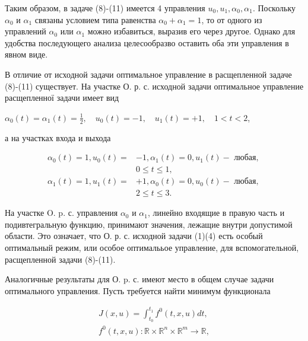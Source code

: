 \documentclass[10pt]{article}
\begin{document}
Таким образом, в задаче (8)-(11) имеется 4 управления $u_{0}, u_{1}, \alpha_{0}, \alpha_{1}$. Поскольку $\alpha_{0}$ и $\alpha_{1}$ связаны условием типа равенства $\alpha_{0}+\alpha_{1}=1$, то от одного из управлений $\alpha_{0}$ или $\alpha_{1}$ можно избавиться, выразив его через другое. Однако для удобства последующего анализа целесообразво оставить оба эти управления в явном виде.



В отличие от исходной задачи оптимальное управление в расщепленной задаче (8)-(11) существует. На участке О. р. с. исходной задачи оптимальное управление расщепленної задачи имеет вид



$\alpha_{0}(t)=\alpha_{1}(t)=\frac{1}{2}, \quad u_{0}(t)=-1, \quad u_{1}(t)=+1, \quad 1<t<2$,



а на участках входа и выхода



\[

\begin{aligned}

\alpha_{0}(t)=1, u_{0}(t)= & -1, \alpha_{1}(t)=0, u_{1}(t)-\text { любая, } \\

& 0 \leqslant t \leqslant 1, \\

\alpha_{1}(t)=1, u_{1}(t)= & +1, \alpha_{0}(t)=0, u_{0}(t)-\text { любая, } \\

& 2 \leqslant t \leqslant 3 .

\end{aligned}

\]



На участке O. p. с. управления $\alpha_{0}$ и $\alpha_{1}$, линейно входящие в правую часть и подивтегральную функцию, принимают значения, лежащие внутри допустимой области. Это означает, что О. р. с. исходной задачи (1)(4) есть особый оптимальный режим, или особое оптималььое управление, для вспомогательной, расщепленной задачи (8)-(11).



Аналогичные результаты для О. p. с. имеют место в общем случае задачи оптимального управления. Пусть требуется найти минимум функционала



\[

\begin{gathered}

J(x, u)=\int_{t_{0}}^{t_{1}} f^{0}(t, x, u) d t, \\

f^{0}(t, x, u): \mathbb{R} \times \mathbb{R}^{n} \times \mathbb{R}^{m} \rightarrow \mathbb{R},

\end{gathered}

\]
\end{document}
